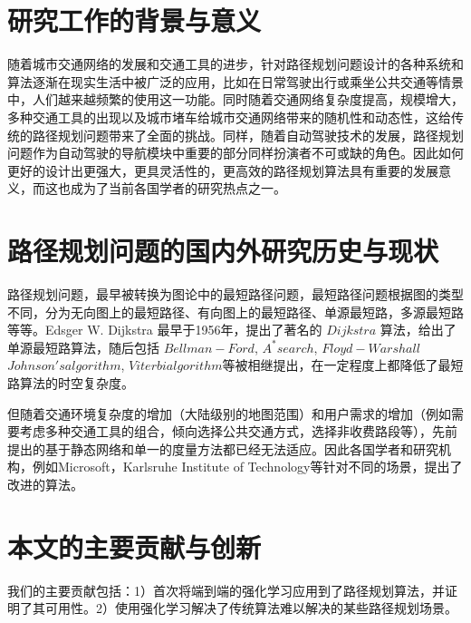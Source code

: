 \documentclass{standalone}
\begin{document}
\thesischapterexordium

\section{研究工作的背景与意义}
随着城市交通网络的发展和交通工具的进步，针对路径规划问题设计的各种系统和算法逐渐在现实生活中被广泛的应用，比如在日常驾驶出行或乘坐公共交通等情景中，人们越来越频繁的使用这一功能。同时随着交通网络复杂度提高，规模增大，多种交通工具的出现以及城市堵车给城市交通网络带来的随机性和动态性，这给传统的路径规划问题带来了全面的挑战。同样，随着自动驾驶技术的发展，路径规划问题作为自动驾驶的导航模块中重要的部分同样扮演者不可或缺的角色。因此如何更好的设计出更强大，更具灵活性的，更高效的路径规划算法具有重要的发展意义，而这也成为了当前各国学者的研究热点之一。


\section{路径规划问题的国内外研究历史与现状}
路径规划问题，最早被转换为图论中的最短路径问题，最短路径问题根据图的类型不同，分为无向图上的最短路径、有向图上的最短路径、单源最短路，多源最短路等等。Edsger W. Dijkstra 最早于1956年，提出了著名的 $Dijkstra$ 算法，给出了单源最短路算法，随后包括 $Bellman-Ford$, $A^* search$, $Floyd-Warshall$ $Johnson's algorithm$, $Viterbi algorithm$等被相继提出，在一定程度上都降低了最短路算法的时空复杂度。\par
但随着交通环境复杂度的增加（大陆级别的地图范围）和用户需求的增加（例如需要考虑多种交通工具的组合，倾向选择公共交通方式，选择非收费路段等），先前提出的基于静态网络和单一的度量方法都已经无法适应。因此各国学者和研究机构，例如Microsoft，Karlsruhe Institute of Technology等针对不同的场景，提出了改进的算法。

\section{本文的主要贡献与创新}
我们的主要贡献包括：1）首次将端到端的强化学习应用到了路径规划算法，并证明了其可用性。2）使用强化学习解决了传统算法难以解决的某些路径规划场景。
\end{document}
